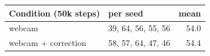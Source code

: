 \begin{tabular}{llr}
\toprule
Condition (50k steps) & per seed & mean \\
\midrule
\condII{} webcam & 39, 64, 56, 55, 56 & 54.0 \\
\condIII{} webcam + correction & 58, 57, 64, 47, 46 & 54.4 \\
\bottomrule
\end{tabular}
